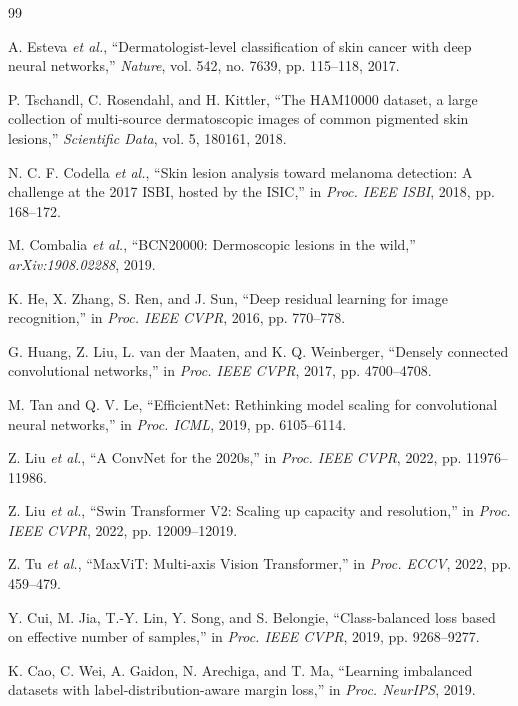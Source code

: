\documentclass[journal]{IEEEtran}
\begin{document}
\balance
\begin{thebibliography}{99}

 A. Esteva \emph{et al.}, ``Dermatologist-level classification of skin
cancer with deep neural networks,'' \emph{Nature}, vol. 542, no. 7639, pp. 115--118, 2017.

 P. Tschandl, C. Rosendahl, and H. Kittler, ``The HAM10000
dataset, a large collection of multi-source dermatoscopic images of common pigmented skin
lesions,'' \emph{Scientific Data}, vol. 5, 180161, 2018.

 N. C. F. Codella \emph{et al.}, ``Skin lesion analysis toward
melanoma detection: A challenge at the 2017 ISBI, hosted by the ISIC,'' in \emph{Proc. IEEE
ISBI}, 2018, pp. 168--172.

 M. Combalia \emph{et al.}, ``BCN20000: Dermoscopic lesions in
the wild,'' \emph{arXiv:1908.02288}, 2019.

 K. He, X. Zhang, S. Ren, and J. Sun, ``Deep residual learning for
image recognition,'' in \emph{Proc. IEEE CVPR}, 2016, pp. 770--778.

 G. Huang, Z. Liu, L. van der Maaten, and K. Q. Weinberger,
``Densely connected convolutional networks,'' in \emph{Proc. IEEE CVPR}, 2017, pp.
4700--4708.

 M. Tan and Q. V. Le, ``EfficientNet: Rethinking model scaling
for convolutional neural networks,'' in \emph{Proc. ICML}, 2019, pp. 6105--6114.

 Z. Liu \emph{et al.}, ``A ConvNet for the 2020s,'' in \emph{Proc.
IEEE CVPR}, 2022, pp. 11976--11986.

 Z. Liu \emph{et al.}, ``Swin Transformer V2: Scaling up capacity and
resolution,'' in \emph{Proc. IEEE CVPR}, 2022, pp. 12009--12019.

 Z. Tu \emph{et al.}, ``MaxViT: Multi-axis Vision Transformer,'' in
\emph{Proc. ECCV}, 2022, pp. 459--479.

 Y. Cui, M. Jia, T.-Y. Lin, Y. Song, and S. Belongie,
``Class-balanced loss based on effective number of samples,'' in \emph{Proc. IEEE CVPR},
2019, pp. 9268--9277.

 K. Cao, C. Wei, A. Gaidon, N. Arechiga, and T. Ma, ``Learning
imbalanced datasets with label-distribution-aware margin loss,'' in \emph{Proc. NeurIPS},
2019.


\end{thebibliography}
\end{document}
